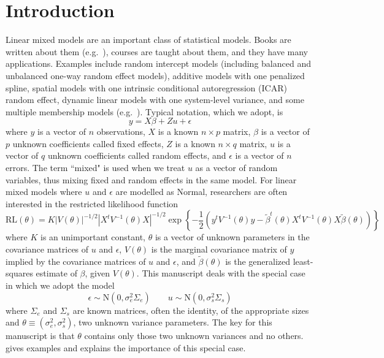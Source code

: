 \documentclass{report}
\newcommand{\N}{\text{N}} %
\newcommand{\RLorig}{\text{RL}}
\begin{document}
\section{Introduction}
\label{sec:intro}
Linear mixed models are an important class of statistical models.  Books are written about them (e.g.\ \citealt{bryk_raudenbush:1992, verbeke&molenberghs:2000, hodges:2013, west&welch&galecki:2014}),  courses are taught about them, and they have many applications.  Examples include random intercept models (including balanced and unbalanced one-way random effect models), additive models with one penalized spline, spatial models with one intrinsic conditional autoregression (ICAR) random effect, dynamic linear models with one system-level variance, and some multiple membership models (e.g.\ \citealt{browne_etal:2001, mccaffrey_etal:2004}).  Typical notation, which we adopt, is
\begin{equation}
\label{eq:lmm}
	y = X\beta + Zu + \epsilon
\end{equation}
where $y$ is a vector of $n$ observations, $X$ is a known $n \times p$ matrix, $\beta$ is a vector of $p$ unknown coefficients called fixed effects, $Z$ is a known $n \times q$ matrix, $u$ is a vector of $q$ unknown coefficients called random effects, and $\epsilon$ is a vector of $n$ errors. The term ``mixed" is used when we treat $u$ as a vector of random variables, thus mixing fixed and random effects in the same model.  For linear mixed models where $u$ and $\epsilon$ are modelled as Normal, researchers are often interested in the restricted likelihood function
\begin{equation}
\label{eq:rll}
  \RLorig(\theta) = K |V(\theta)|^{-1/2}|X^tV^{-1}(\theta)X|^{-1/2}
                       \exp\left\{ -\frac{1}{2} \left(y^tV^{-1}(\theta)y -
                                                                \tilde\beta^t(\theta)X^tV^{-1}(\theta)X\tilde\beta(\theta)
                                                         \right)
                              \right\}
\end{equation}
where $K$ is an unimportant constant, $\theta$ is a vector of unknown parameters in the covariance matrices of $u$ and $\epsilon$, $V(\theta)$ is the marginal covariance matrix of $y$ implied by the covariance matrices of $u$ and $\epsilon$, and $\tilde\beta(\theta)$ is the generalized least-squares estimate of $\beta$, given $V(\theta)$.
This manuscript deals with the special case in which we adopt the model
\begin{equation*}
	\epsilon \sim \N (0, \sigma_e^2 \Sigma_e) \qquad u \sim \N (0, \sigma_s^2 \Sigma_s)
\end{equation*}
where $\Sigma_e$ and $\Sigma_s$ are known matrices, often the identity, of the appropriate sizes and $\theta \equiv (\sigma_e^2, \sigma_s^2)$, two unknown variance parameters.  The key for this manuscript is that $\theta$ contains only those two unknown variances and no others.  \cite{hodges:2013} gives examples and explains the importance of this special case.
\end{document}
